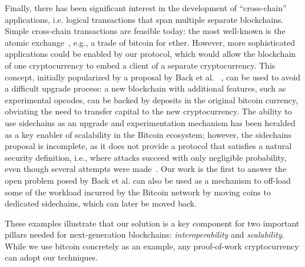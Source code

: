 Finally, there has been significant interest in the development of
``cross-chain'' applications, i.e. logical transactions that span multiple
separate blockchains. Simple cross-chain transactions are feasible today: the
most well-known is the atomic exchange~\cite{tiernolan}, e.g., a trade of
bitcoin for ether. However, more sophisticated applications could be enabled by
our protocol, which would allow the blockchain of one cryptocurrency to embed a
client of a separate cryptocurrency. This concept, initially popularized by a
proposal by Back et al. ~\cite{sidechains}, can be used to avoid a difficult
upgrade process: a new blockchain with additional features, such as experimental
opcodes, can be backed by deposits in the original bitcoin currency, obviating
the need to transfer capital to the new cryptocurrency. The ability to use sidechains
as an upgrade and experimentation mechanism has been heralded as a key enabler
of scalability in the Bitcoin ecosystem; however, the sidechains proposal is
incomplete, as it does not provide a protocol that satisfies a natural security
definition, i.e., where attacks succeed with only negligible probability, even
though several attempts were made~\cite{pos,compactspv}. Our work is the
first to answer the open problem posed by Back et al.   can also be
used as a mechanism to off-load some of the workload incurred by the Bitcoin
network by moving coins to dedicated sidechains, which can later be moved back.

These examples illustrate that our solution is a key component for two important
pillars needed for next-generation blockchains: \textit{interoperability} and
\textit{scalability}. While we use bitcoin concretely as an example, any
proof-of-work cryptocurrency can adopt our techniques.

